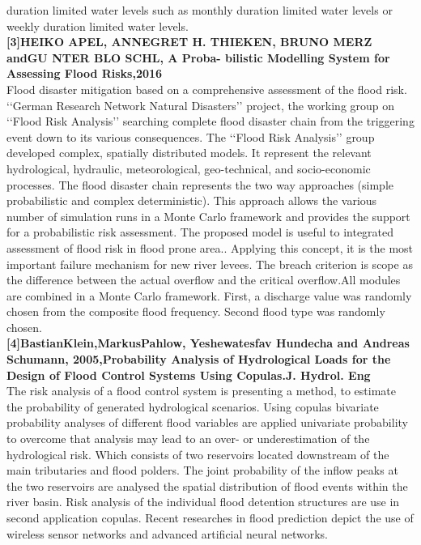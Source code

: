 \documentclass[a4paper,12pt]{report}
\begin{document}
duration limited water levels such as monthly duration limited water levels or weekly duration limited water levels.\\
\textbf{[3]HEIKO APEL, ANNEGRET H. THIEKEN, BRUNO
MERZ andGU NTER BLO SCHL, A Proba-
bilistic Modelling System for Assessing Flood Risks,2016}\\
 Flood disaster mitigation based on a comprehensive assessment of the flood risk. ‘‘German Research
Network Natural Disasters’’ project, the working group on ‘‘Flood Risk Analysis’’ searching complete flood disaster
chain from the triggering event down to its various consequences. The ‘‘Flood Risk Analysis’’ group developed
complex, spatially distributed models. It represent the relevant hydrological, hydraulic, meteorological, geo-technical,
and socio-economic processes. The flood disaster chain represents the two way approaches (simple probabilistic and
complex deterministic). This approach allows the various number of simulation runs in a Monte Carlo framework and
provides the support for a probabilistic risk assessment. The proposed model is useful to integrated assessment of flood
risk in flood prone area.. Applying this concept, it is the most important failure mechanism for new river levees. The
breach criterion is scope as the difference between the actual overflow and the critical overflow.All modules are
combined in a Monte Carlo framework. First, a discharge value was randomly chosen from the composite flood
frequency. Second flood type was randomly chosen.\\
\textbf{[4]BastianKlein,MarkusPahlow,
Yeshewatesfav Hundecha and Andreas
Schumann, 2005,Probability Analysis of Hydrological
Loads for the Design of Flood Control Systems Using
Copulas.J. Hydrol. Eng}\\
 The risk analysis of a flood control system is presenting a method, to estimate the probability of generated
hydrological scenarios. Using copulas bivariate probability analyses of different flood variables are applied univariate
probability to overcome that analysis may lead to an over- or underestimation of the hydrological risk. Which consists
of two reservoirs located downstream of the main tributaries and flood polders. The joint probability of the inflow
peaks at the two reservoirs are analysed the spatial distribution of flood events within the river basin. Risk analysis of
the individual flood detention structures are use in second application copulas.
Recent researches in flood prediction depict the use of
wireless sensor networks and advanced artificial neural
networks. \\
\end{document}
